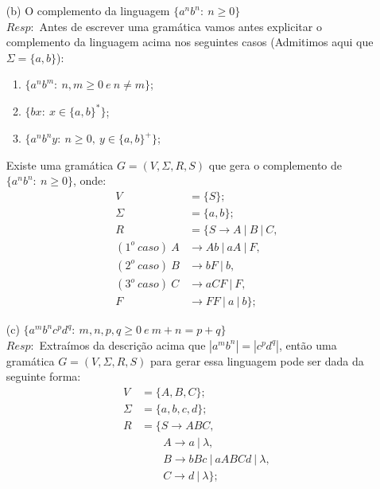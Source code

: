 \documentclass{homework}
\begin{document}
\pagestyle{fancy}

	\begin{itemize}
		\item[(b)] O complemento da linguagem $\{a^n b^n:\ n \geq 0\}$\\
		$Resp:$ Antes de escrever uma gramática vamos antes explicitar o complemento da linguagem acima nos seguintes casos (Admitimos aqui que $\Sigma = \{a,b\}$):
		\begin{enumerate}
			\item $\{a^n b^m:\ n,m \geq 0\ e\ n \neq m\}$;
			\item $\{b x:\ x \in \{a,b\}^*\}$;
			\item $\{a^n b^n y:\ n \geq 0,\ y \in \{a,b\}^+\}$;
		\end{enumerate}		 Existe uma gramática $G = (V, \Sigma, R, S)$ que gera o complemento de $\{a^n b^n:\ n \geq 0\}$, onde: %
		\begin{align*}
			V &= \{S\};\\
			\Sigma &= \{a,b\};\\
			R &= \{S \rightarrow A\ |\ B\ |\ C,\\
			(1^o\ caso)\ A & \rightarrow Ab\ |\ aA\ |\ F,\\
			(2^o\ caso)\ B & \rightarrow bF\ |\ b,\\
			(3^o\ caso)\ C & \rightarrow aCF\ |\ F,\\
			F & \rightarrow FF\ |\ a\ |\ b\};
		\end{align*}
		\item[(c)] $\{a^m b^n c^p d^q:\ m,n,p,q \geq 0\ e\ m + n = p + q\}$\\
		$Resp:$ Extraímos da descrição acima que $|a^m b^n| = |c^p d^q|$, então uma gramática $G = (V, \Sigma, R, S)$ para gerar essa linguagem pode ser dada da seguinte forma: %
		\begin{align*}
			V &= \{A, B, C\};\\
			\Sigma &= \{a,b,c,d\};\\
			R &= \{S \rightarrow ABC,\\
				&\qquad	A \rightarrow a\ |\ \lambda, \\
				&\qquad	B \rightarrow bBc\ |\ aABCd\ |\ \lambda, \\
				&\qquad	C \rightarrow d\ |\ \lambda\};
		\end{align*}
	\end{itemize}
\pagebreak
\end{document}
